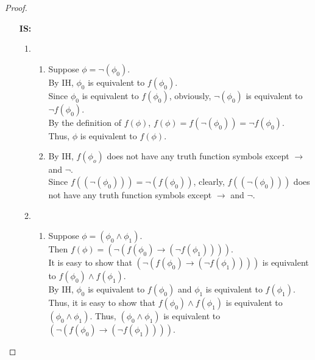 \documentclass[12pt,a4paper]{article}
\theoremstyle{plain}
\begin{document}
\begin{proof}
\begin{itemize}
            \item[\textbf{IS:}]
                \begin{enumerate}
                    \item 
                        \begin{enumerate}
                            \item 
                                Suppose $\phi=\neg (\phi_0)$.\\
                                By IH, $\phi_0$ is equivalent to $f(\phi_0)$.\\
                                Since $\phi_0$ is equivalent to $f(\phi_0)$, obviously, $\neg (\phi_0)$ is equivalent to $\neg f(\phi_0)$.\\ 
                                By the definition of $f(\phi)$, $f(\phi)=f(\neg (\phi_0))=\neg f(\phi_0)$.\\
                                Thus, $\phi $ is equivalent to $f(\phi)$.
                            \item
                                By IH, $f(\phi_o)$ does not  have any truth function symbols except $\rightarrow$ and $\neg$.\\
                                Since $f((\neg(\phi_0)))=\neg(f(\phi_0))$, clearly, $f((\neg(\phi_0)))$ does not have any truth function symbols except $\rightarrow$ and $\neg$.
                        \end{enumerate}
                    \item
                        \begin{enumerate}
                            \item 
                                Suppose $\phi=(\phi_0 \wedge \phi_1)$.\\
                                Then $f(\phi)=( \neg ( f (\phi_0) \rightarrow ( \neg f (\phi_1) ) ) ) $.\\
                                It is easy to show that $( \neg ( f (\phi_0) \rightarrow ( \neg f (\phi_1) ) ) )$ is equivalent to $f(\phi_0) \wedge f(\phi_1)$.\\
                                By IH, $\phi_0$ is equivalent to $f(\phi_0)$ and $\phi_1$ is equivalent to $f(\phi_1)$.\\
                                Thus, it is easy to show that $f(\phi_0) \wedge f(\phi_1)$ is equivalent to$(\phi_0 \wedge \phi_1)$.
                                Thus, $(\phi_0 \wedge \phi_1)$ is equivalent to $( \neg ( f (\phi_0) \rightarrow ( \neg f (\phi_1) ) ) )$.

\end{enumerate}
\end{enumerate}
\end{itemize}
\end{proof}
\end{document}
